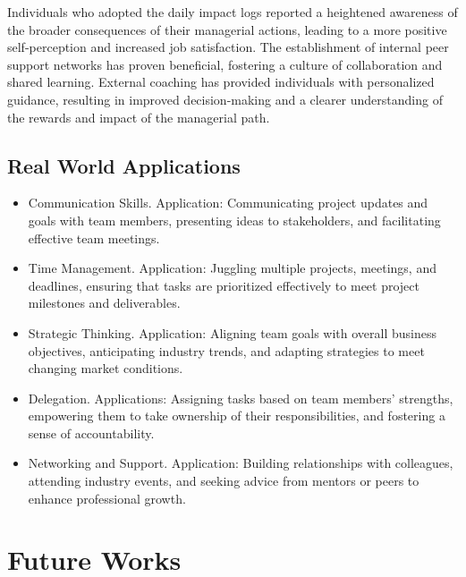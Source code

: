 \documentclass[runningheads]{article}
\begin{document}
Individuals who adopted the daily impact logs reported a heightened awareness of the broader consequences of their managerial actions, leading to a more positive self-perception and increased job satisfaction. The establishment of internal peer support networks has proven beneficial, fostering a culture of collaboration and shared learning. External coaching has provided individuals with personalized guidance, resulting in improved decision-making and a clearer understanding of the rewards and impact of the managerial path.

\subsection{Real World Applications}

\begin{itemize}
    \item Communication Skills. Application: Communicating project updates and goals with team members, presenting ideas to stakeholders, and facilitating effective team meetings.

    \item Time Management. Application: Juggling multiple projects, meetings, and deadlines, ensuring that tasks are prioritized effectively to meet project milestones and deliverables.

    \item Strategic Thinking. Application: Aligning team goals with overall business objectives, anticipating industry trends, and adapting strategies to meet changing market conditions.

    \item Delegation. Applications: Assigning tasks based on team members' strengths, empowering them to take ownership of their responsibilities, and fostering a sense of accountability.

    \item Networking and Support. Application: Building relationships with colleagues, attending industry events, and seeking advice from mentors or peers to enhance professional growth.
\end{itemize}

\section{Future Works}
\end{document}
